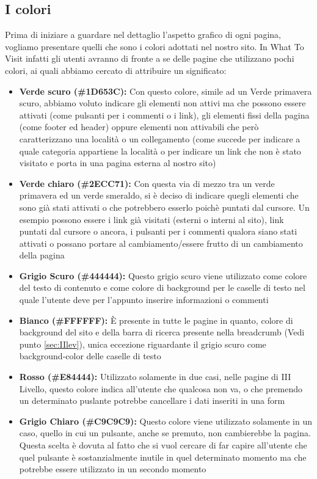 \subsection{I colori}
Prima di iniziare a guardare nel dettaglio l'aspetto grafico di ogni pagina, vogliamo presentare quelli che sono i colori adottati nel nostro sito. In What To Visit infatti gli utenti avranno di fronte a se delle pagine che utilizzano pochi colori, ai quali abbiamo cercato di attribuire un significato:
\begin{itemize}
\item \textbf{Verde scuro (\#1D653C):} Con questo colore, simile ad un Verde primavera scuro, abbiamo voluto indicare gli elementi non attivi ma che possono essere attivati (come pulsanti per i commenti o i link), gli elementi fissi della pagina (come footer ed header) oppure elementi non attivabili che però caratterizzano una località o un collegamento (come succede per indicare a quale categoria appartiene la località o per indicare un link che non è stato visitato e porta in una pagina esterna al nostro sito)
\item \textbf{Verde chiaro (\#2ECC71):} Con questa via di mezzo tra un verde primavera ed un verde smeraldo, si è deciso di indicare quegli elementi che sono già stati attivati o che potrebbero esserlo poichè puntati dal cursore. Un esempio possono essere i link già visitati (esterni o interni al sito), link puntati dal cursore o ancora, i pulsanti per i commenti qualora siano stati attivati o possano portare al cambiamento/essere frutto di un cambiamento della pagina
\item \textbf{Grigio Scuro (\#444444):} Questo grigio scuro viene utilizzato come colore del testo di contenuto e come colore di background per le caselle di testo nel quale l'utente deve per l'appunto inserire informazioni o commenti
\item \textbf{Bianco (\#FFFFFF):} È presente in tutte le pagine in quanto, colore di background del sito e della barra di ricerca presente nella breadcrumb (Vedi punto \ref{sec:IIlev}), unica eccezione riguardante il grigio scuro come background-color delle caselle di testo
\item \textbf{Rosso (\#E84444):} Utilizzato solamente in due casi, nelle pagine di III Livello, questo colore indica all'utente che qualcosa non va, o che premendo un determinato puslante potrebbe cancellare i dati inseriti in una form
\item \textbf{Grigio Chiaro (\#C9C9C9):} Questo colore viene utilizzato solamente in un caso, quello in cui un pulsante, anche se premuto, non cambierebbe la pagina. Questa scelta è dovuta al fatto che si vuol cercare di far capire all'utente che quel pulsante è sostanzialmente inutile in quel determinato momento ma che potrebbe essere utilizzato in un secondo momento
\end{itemize}

